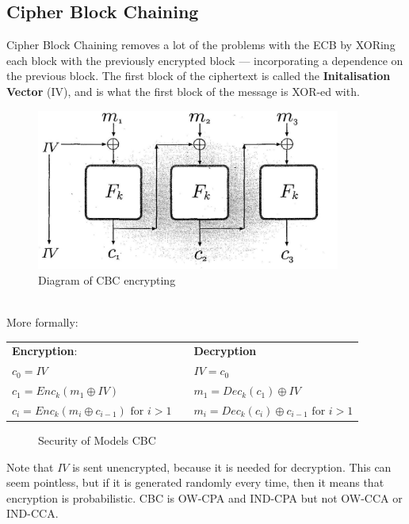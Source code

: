     
    
    \subsection{Cipher Block Chaining}
    Cipher Block Chaining removes a lot of the problems with the ECB by XORing each block with the previously encrypted block --- incorporating a dependence on the previous block. The first block of the ciphertext is called the \textbf{Initalisation Vector} (IV), and is what the first block of the message is XOR-ed with.\\
    \begin{figure}[htp!]
        \centering
        \includegraphics[width=10cm]{img/cbc}
        \caption{Diagram of CBC encrypting}
    \end{figure}
    \\
    More formally:\nopagebreak
    \begin{center}
    \begin{tabular}{lll}
    \textbf{Encryption}:                                        && \textbf{Decryption}\\
    $c_0 = IV$                                                  && $IV = c_0$\\
    $c_1 = Enc_k(m_1 \oplus IV)$                                && $m_1 = Dec_k(c_1) \oplus IV$\\
    $c_i = Enc_k(m_i \oplus c_{i-1}) \textrm{ for } i > 1$      && $m_i = Dec_k(c_i) \oplus c_{i-1} \textrm{ for } i > 1$\\
    \end{tabular}
    \end{center}
    \begin{figure}[htp!]
        \centering
        \caption{Security of Models CBC}
        \label{fig:cbc-attacktable}
    \end{figure}
    Note that $IV$ is sent unencrypted, because it is needed for decryption. This can seem pointless, but if it is generated randomly every time, then it means that encryption is probabilistic. CBC is OW-CPA and IND-CPA but not OW-CCA or IND-CCA.\\
